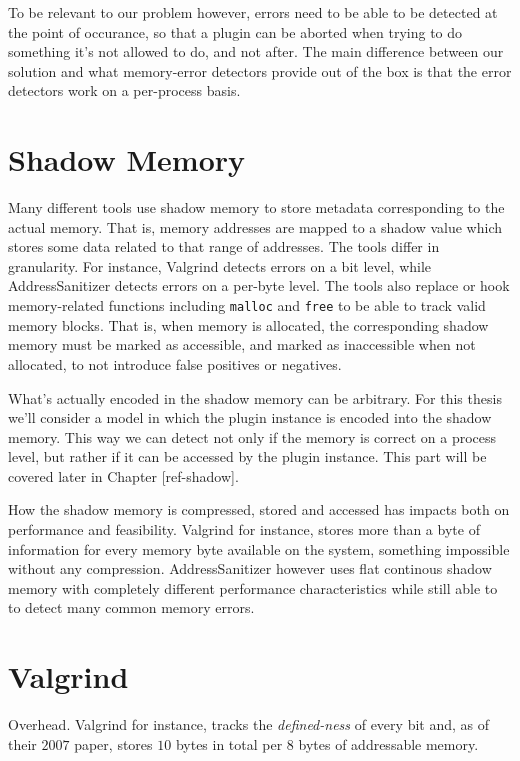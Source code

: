To be relevant to our problem however, errors need to be able to be detected at
the point of occurance, so that a plugin can be aborted when trying to do
something it's not allowed to do, and not after. The main difference between our
solution and what memory-error detectors provide out of the box is that the
error detectors work on a per-process basis.


\section {Shadow Memory}

Many different tools use shadow memory to store metadata corresponding to the
actual memory. That is, memory addresses are mapped to a shadow value which
stores some data related to that range of addresses. The tools differ in
granularity. For instance, Valgrind detects errors on a bit level, while
AddressSanitizer detects errors on a per-byte level. The tools also replace or
hook memory-related functions including \texttt{malloc} and \texttt{free} to be
able to track valid memory blocks. That is, when memory is allocated, the
corresponding shadow memory must be marked as accessible, and marked as
inaccessible when not allocated, to not introduce false positives or negatives.

What's actually encoded in the shadow memory can be arbitrary. For this thesis
we'll consider a model in which the plugin instance is encoded into the shadow
memory. This way we can detect not only if the memory is correct on a process
level, but rather if it can be accessed by the plugin instance. This part will
be covered later in Chapter [ref-shadow].

How the shadow memory is compressed, stored and accessed has impacts both on
performance and feasibility. Valgrind for instance, stores more than a byte of
information for every memory byte available on the system, something impossible
without any compression. AddressSanitizer however uses flat continous shadow
memory with completely different performance characteristics while still able to
to detect many common memory errors.


\section {Valgrind}

Overhead.
Valgrind for instance, tracks the \emph{defined-ness} of every bit and, as of
their $2007$ paper, stores $10$ bytes in total per $8$ bytes of addressable
memory.

